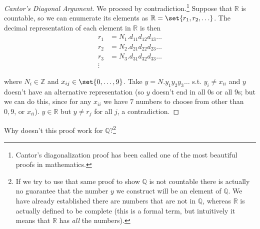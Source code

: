 \documentclass{article}
\begin{document}
\begin{proof}[Cantor's Diagonal Argument]
  We proceed by contradiction.\footnote{Cantor's diagonalization proof has been called one of the most beautiful proofs in mathematics.} Suppose that $\mathbb{R}$ is countable, so we can enumerate its elements as $\mathbb{R} = \set{r_1, r_2, \ldots}$. The decimal representation of each element in $\mathbb{R}$ is then
  \begin{align*}
    r_1 & = N_1.d_{11}d_{12}d_{13}\ldots \\
    r_2 & = N_2.d_{21}d_{22}d_{23}\ldots \\
    r_3 & = N_3.d_{31}d_{32}d_{33}\ldots \\
    \vdots
  \end{align*}

  where $N_i \in \mathbb{Z}$ and $x_{ij} \in \set{0, \ldots, 9}$. Take $y = N.y_1y_2y_3\ldots$ s.t. $y_i \ne x_{ii}$ and $y$ doesn't have an alternative representation (so $y$ doesn't end in all $0$s or all $9$s; but we can do this, since for any $x_{ii}$ we have $7$ numbers to choose from other than $0, 9$, or $x_{ii}$). $y \in \mathbb{R}$ but $y \ne r_j$ for all $j$, a contradiction.
\end{proof}

Why doesn't this proof work for $\mathbb{Q}$?\footnote{If we try to use that same proof to show $\mathbb{Q}$ is not countable there is actually no guarantee that the number $y$ we construct will be an element of $\mathbb{Q}$. We have already established there are numbers that are not in $\mathbb{Q}$, whereas $\mathbb{R}$ is actually defined to be complete (this is a formal term, but intuitively it means that $\mathbb{R}$ has \textit{all} the numbers).}
\end{document}
